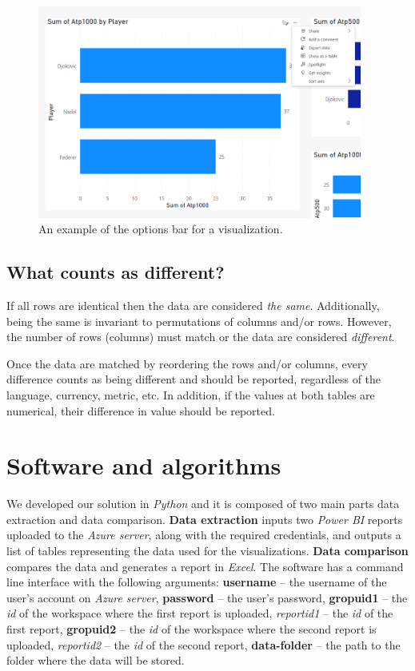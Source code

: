 \documentclass[fleqn,moreauthors,10pt]{ds_report}
\begin{document}
 \begin{figure}
    \centering
    \includegraphics[width=\linewidth, height=7cm]{fig/eport.png}
    \caption{An example of the options bar for a visualization.}
    \label{fig:eport}
\end{figure}

\subsection*{What counts as different?}

If all rows are identical then the data are considered \emph{the same}. Additionally, being the same is invariant to permutations of columns and/or rows. However, the number of rows (columns) must match or the data are considered \emph{different}.
\par
Once the data are matched by reordering the rows and/or columns, every difference counts as being different and should be reported, regardless of the language, currency, metric, etc. In addition, if the values at both tables are numerical, their difference in value should be reported.

\section*{Software and algorithms}
We developed our solution in \textit{Python} and it is composed of two main parts\: data extraction and data comparison. \textbf{Data extraction} inputs two \textit{Power BI} reports uploaded to the \textit{Azure server}, along with the required credentials, and outputs a list of tables representing the data used for the visualizations. \textbf{Data comparison} compares the data and generates a report in \textit{Excel}. The software has a command line interface with the following arguments: \textbf{username} -- the username of the user's account on \textit{Azure server}, \textbf{password} -- the user's password, \textbf{gropuid1} -- the \textit{id} of the workspace where the first report is uploaded, \textit{reportid1} -- the \textit{id} of the first report, \textbf{gropuid2} -- the \textit{id} of the workspace where the second report is uploaded, \textit{reportid2} -- the \textit{id} of the second report, \textbf{data-folder} -- the path to the folder where the data will be stored. 
\end{document}
